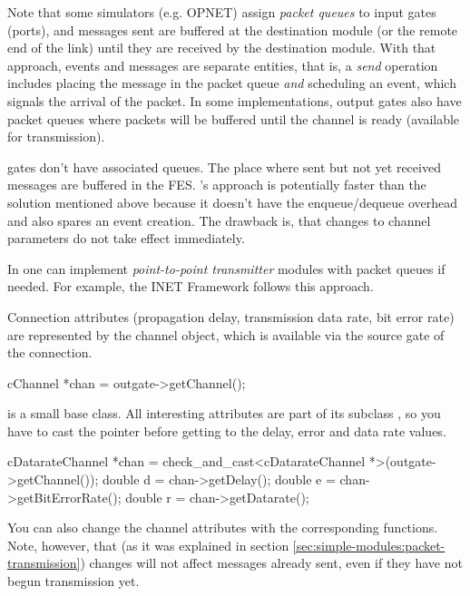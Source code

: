 Note that some simulators (e.g. OPNET) assign \textit{packet queues}
to input gates (ports), and messages sent are buffered at the
destination module (or the remote end of the link) until they are
received by the destination module. With that approach, events and
messages are separate entities, that is, a \textit{send} operation
includes placing the message in the packet queue \textit{and} scheduling
an event, which signals the arrival of the packet. In some implementations,
output gates also have packet queues where packets will be buffered until
the channel is ready (available for transmission).

{\opp} gates don't have associated queues. The place
where sent but not yet received messages are buffered in the
FES.  {\opp}'s approach is potentially faster
than the solution mentioned above because it doesn't have the
enqueue/dequeue overhead and also spares an event creation. The
drawback is, that changes to channel parameters do not take effect
immediately.

In {\opp} one can implement \textit{point-to-point transmitter} modules
with packet queues if needed. For example, the INET Framework
follows this approach.





Connection attributes (propagation delay, transmission data rate,
bit error rate) are represented by the channel object, which
is available via the source gate of the connection.

\begin{cpp}
cChannel *chan = outgate->getChannel();
\end{cpp}

 is a small base class. All interesting attributes are
part of its subclass , so you have to cast the pointer
before getting to the delay, error and data rate values.

\begin{cpp}
cDatarateChannel *chan = check_and_cast<cDatarateChannel *>(outgate->getChannel());
double d = chan->getDelay();
double e = chan->getBitErrorRate();
double r = chan->getDatarate();
\end{cpp}

You can also change the channel attributes with the corresponding
 functions. Note, however, that (as it was explained in
section \ref{sec:simple-modules:packet-transmission})
changes will not affect messages already sent, even if they have not
begun transmission yet.

